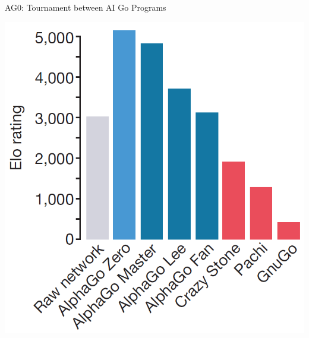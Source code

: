 \documentclass{beamer}
\begin{document}
{    \begin{frame}{AG0: Tournament between AI Go Programs}
      \begin{center}
        \includegraphics[height=.9\textheight]{../img/AG0-paper/elo-from-tournament.png}
      \end{center}
    \end{frame}

}
\end{document}
